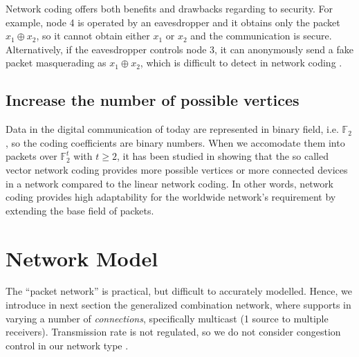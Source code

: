 Network coding offers both benefits and drawbacks regarding to security.
For example, node 4 is operated by an eavesdropper and it obtains
only the packet $x_{1}\oplus x_{2}$, so it cannot obtain either $x_{1}$
or $x_{2}$ and the communication is secure. Alternatively, if the
eavesdropper controls node 3, it can anonymously send a fake packet
masquerading as $x_{1}\oplus x_{2}$, which is difficult to detect
in network coding \cite{Ho:2008}.

\subsection{Increase the number of possible vertices}

Data in the digital communication of today are represented in binary
field, i.e. $\ensuremath{\mathbb{F}}_{2}$, so the coding coefficients
are binary numbers. When we accomodate them into packets over $\ensuremath{\mathbb{F}}_{2}^{t}$
with $t\geq2$, it has been studied in \cite{Ebrahimi:2011,Wachter-Zeh:2018}
showing that the so called vector network coding provides more possible
vertices or more connected devices in a network compared to the linear
network coding. In other words, network coding provides high adaptability
for the worldwide network's requirement by extending the base field
of packets. 

\section{Network Model}

The ``packet network'' is practical, but difficult to accurately
modelled. Hence, we introduce in next section the generalized combination
network, where supports in varying a number of \textit{connections},
specifically multicast (1 source to multiple receivers). Transmission
rate is not regulated, so we do not consider congestion control in
our network type \cite{Ho:2008}.

\clearpage